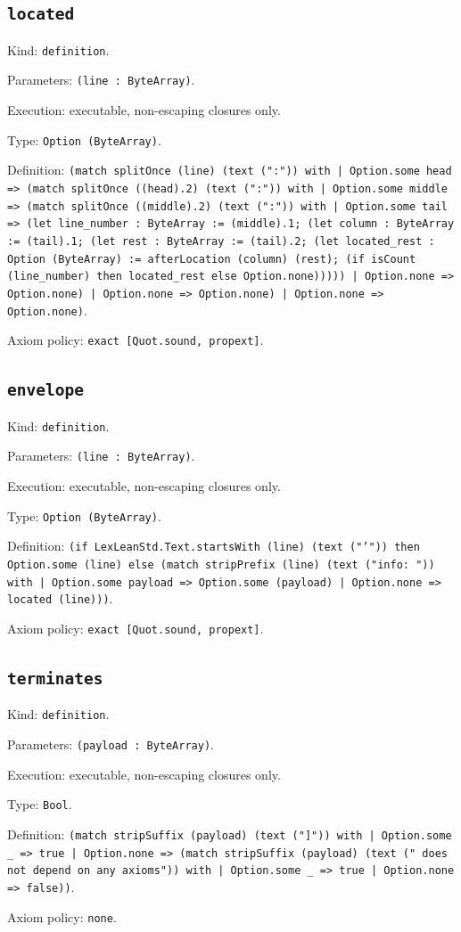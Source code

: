 \documentclass[11pt]{article}
\begin{document}
\subsection*{\texttt{located}}
\noindent Kind: \texttt{definition}.\par
\noindent Parameters: \texttt{(line : ByteArray)}.\par
\noindent Execution: executable, non-escaping closures only.\par
\noindent Type: \texttt{Option (ByteArray)}.\par
\noindent Definition: \texttt{(match splitOnce (line) (text (":")) with | Option.some head => (match splitOnce ((head).2) (text (":")) with | Option.some middle => (match splitOnce ((middle).2) (text (":")) with | Option.some tail => (let line\_number : ByteArray := (middle).1; (let column : ByteArray := (tail).1; (let rest : ByteArray := (tail).2; (let located\_rest : Option (ByteArray) := afterLocation (column) (rest); (if isCount (line\_number) then located\_rest else Option.none))))) | Option.none => Option.none) | Option.none => Option.none) | Option.none => Option.none)}.\par
\noindent Axiom policy: \texttt{exact [Quot.sound, propext]}.\par
\subsection*{\texttt{envelope}}
\noindent Kind: \texttt{definition}.\par
\noindent Parameters: \texttt{(line : ByteArray)}.\par
\noindent Execution: executable, non-escaping closures only.\par
\noindent Type: \texttt{Option (ByteArray)}.\par
\noindent Definition: \texttt{(if LexLeanStd.Text.startsWith (line) (text ("'")) then Option.some (line) else (match stripPrefix (line) (text ("info: ")) with | Option.some payload => Option.some (payload) | Option.none => located (line)))}.\par
\noindent Axiom policy: \texttt{exact [Quot.sound, propext]}.\par
\subsection*{\texttt{terminates}}
\noindent Kind: \texttt{definition}.\par
\noindent Parameters: \texttt{(payload : ByteArray)}.\par
\noindent Execution: executable, non-escaping closures only.\par
\noindent Type: \texttt{Bool}.\par
\noindent Definition: \texttt{(match stripSuffix (payload) (text ("]")) with | Option.some \_ => true | Option.none => (match stripSuffix (payload) (text (" does not depend on any axioms")) with | Option.some \_ => true | Option.none => false))}.\par
\noindent Axiom policy: \texttt{none}.\par
\end{document}
